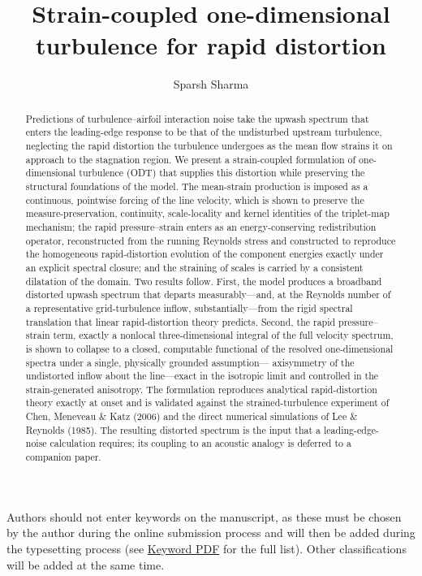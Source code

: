 \documentclass[lineno]{JFM-FLM_Au}
\title{Strain-coupled one-dimensional turbulence for rapid distortion}
\author{Sparsh Sharma\aff{1}}
\affiliation{\aff{1}German Aerospace Center (DLR), 38108 Braunschweig, Germany}
\newcounter{assumption}
\begin{document}
\maketitle

\begin{abstract}
Predictions of turbulence--airfoil interaction noise take the upwash spectrum
that enters the leading-edge response to be that of the undisturbed upstream
turbulence, neglecting the rapid distortion the turbulence undergoes as the
mean flow strains it on approach to the stagnation region. We present a
strain-coupled formulation of one-dimensional turbulence (ODT) that supplies
this distortion while preserving the structural foundations of the model. The
mean-strain production is imposed as a continuous, pointwise forcing of the
line velocity, which is shown to preserve the measure-preservation, continuity,
scale-locality and kernel identities of the triplet-map mechanism; the rapid
pressure--strain enters as an energy-conserving redistribution operator,
reconstructed from the running Reynolds stress and constructed to reproduce the
homogeneous rapid-distortion evolution of the component energies exactly under
an explicit spectral closure; and the straining of scales is carried by a
consistent dilatation of the domain. Two results follow. First, the model
produces a broadband distorted upwash spectrum that departs measurably---and,
at the Reynolds number of a representative grid-turbulence inflow,
substantially---from the rigid spectral translation that linear
rapid-distortion theory predicts. Second, the rapid pressure--strain term,
exactly a nonlocal three-dimensional integral of the full velocity spectrum, is
shown to collapse to a closed, computable functional of the resolved
one-dimensional spectra under a single, physically grounded assumption---%
axisymmetry of the undistorted inflow about the line---exact in the isotropic
limit and controlled in the strain-generated anisotropy. The formulation
reproduces analytical rapid-distortion theory exactly at onset and is validated
against the strained-turbulence experiment of Chen, Meneveau \& Katz (2006) and
the direct numerical simulations of Lee \& Reynolds (1985). The resulting
distorted spectrum is the input that a leading-edge-noise calculation requires;
its coupling to an acoustic analogy is deferred to a companion paper.
\end{abstract}

\begin{keywords}
Authors should not enter keywords on the manuscript, as these must be chosen by the author during the online submission process and will then be added during the typesetting process (see \href{https://www.cambridge.org/core/services/aop-file-manager/file/61436b61ff7f3cfab749ce3a/JFM-Keywords-Sept-2021.pdf.}{Keyword PDF} for the full list).  Other classifications will be added at the same time.
\end{keywords}
\end{document}
